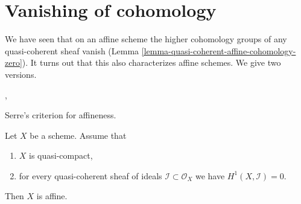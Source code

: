 \section{Vanishing of cohomology}
\label{section-vanishing}

\noindent
We have seen that on an affine scheme the higher cohomology groups
of any quasi-coherent sheaf vanish
(Lemma \ref{lemma-quasi-coherent-affine-cohomology-zero}).
It turns out that this also
characterizes affine schemes. We give two versions.

\begin{lemma}
\label{lemma-quasi-compact-h1-zero-covering}
\begin{reference}
\cite{Serre-criterion}, \cite[II, Theorem 5.2.1 (d') and IV (1.7.17)]{EGA}
\end{reference}
\begin{slogan}
Serre's criterion for affineness.
\end{slogan}
Let $X$ be a scheme.
Assume that
\begin{enumerate}
\item $X$ is quasi-compact,
\item for every quasi-coherent sheaf of ideals
$\mathcal{I} \subset \mathcal{O}_X$ we have $H^1(X, \mathcal{I}) = 0$.
\end{enumerate}
Then $X$ is affine.
\end{lemma}

